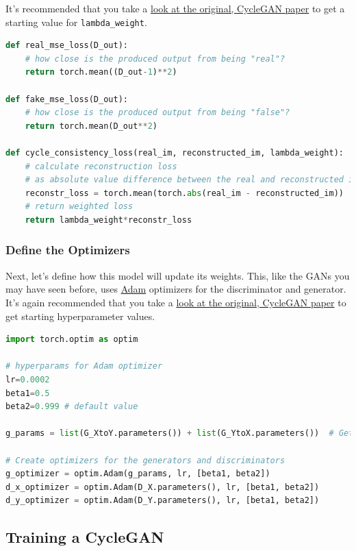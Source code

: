 It's recommended that you take a
\href{https://arxiv.org/pdf/1703.10593.pdf}{look at the original,
CycleGAN paper} to get a starting value for
\lstinline{lambda_weight}.

\begin{lstlisting}[language=Python]
def real_mse_loss(D_out):
    # how close is the produced output from being "real"?
    return torch.mean((D_out-1)**2)

def fake_mse_loss(D_out):
    # how close is the produced output from being "false"?
    return torch.mean(D_out**2)

def cycle_consistency_loss(real_im, reconstructed_im, lambda_weight):
    # calculate reconstruction loss 
    # as absolute value difference between the real and reconstructed images
    reconstr_loss = torch.mean(torch.abs(real_im - reconstructed_im))
    # return weighted loss
    return lambda_weight*reconstr_loss    
\end{lstlisting}

\subsubsection{Define the Optimizers}

Next, let's define how this model will update its weights. This, like
the GANs you may have seen before, uses
\href{https://pytorch.org/docs/stable/optim.html\#algorithms}{Adam}
optimizers for the discriminator and generator. It's again recommended
that you take a \href{https://arxiv.org/pdf/1703.10593.pdf}{look at the
original, CycleGAN paper} to get starting hyperparameter values.

\begin{lstlisting}[language=Python]
import torch.optim as optim

# hyperparams for Adam optimizer
lr=0.0002
beta1=0.5
beta2=0.999 # default value

g_params = list(G_XtoY.parameters()) + list(G_YtoX.parameters())  # Get generator parameters

# Create optimizers for the generators and discriminators
g_optimizer = optim.Adam(g_params, lr, [beta1, beta2])
d_x_optimizer = optim.Adam(D_X.parameters(), lr, [beta1, beta2])
d_y_optimizer = optim.Adam(D_Y.parameters(), lr, [beta1, beta2])
\end{lstlisting}

\subsection{Training a CycleGAN}

